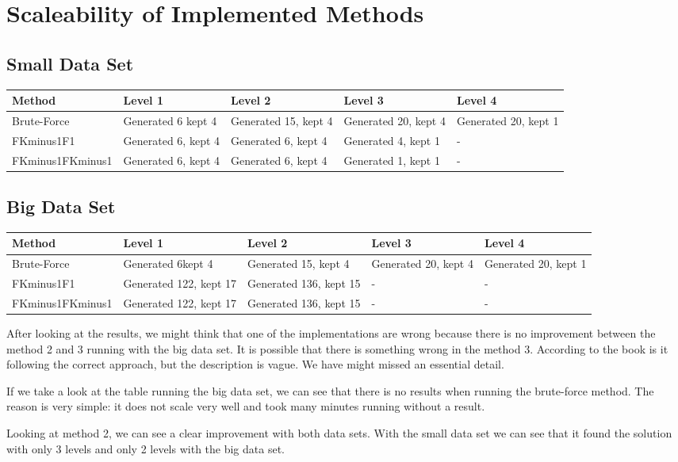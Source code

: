 \section{Scaleability of Implemented Methods}
	
	\subsection*{Small Data Set}
	\begin{table}[H]
		\begin{tabular}{| p{3.5cm} | p{2.5cm} | p{2.5cm} | p{2.5cm} | p{2.5cm} | }
			\hline
			Method & Level 1 & Level 2 & Level 3 & Level 4 \\ \hline
			Brute-Force & Generated 6 kept 4 & Generated 15, kept 4 & Generated 20, kept 4 & Generated 20, kept 1 \\ \hline
			FKminus1F1 & Generated 6, kept 4 & Generated 6, kept 4 & Generated 4, kept 1 & - \\ \hline
			FKminus1FKminus1 & Generated 6, kept 4 & Generated 6, kept 4 & Generated 1, kept 1 & - \\ \hline
		\end{tabular}
	\end{table}

	\subsection*{\bf Big Data Set}
	\begin{table}[H]
		\begin{tabular}{| p{3.5cm} | p{2.5cm} | p{2.5cm} | p{2.5cm} | p{2.5cm} | }
			\hline
			Method & Level 1 & Level 2 & Level 3 & Level 4 \\ \hline
			Brute-Force & Generated 6kept 4 & Generated 15, kept 4 & Generated 20, kept 4 & Generated 20, kept 1 \\ \hline
			FKminus1F1 & Generated 122, kept 17 & Generated 136, kept 15 & - & - \\ \hline
			FKminus1FKminus1 & Generated 122, kept 17 & Generated 136, kept 15 & - & - \\ \hline
		\end{tabular}
	\end{table}


	After looking at the results, we might think that one of the implementations are wrong because
	there is no improvement between the method 2 and 3 running with the big data set. It is possible that 
	there is something wrong in the method 3. According to the book is it following the correct
	approach, but the description is vague. We have might missed an essential detail. 


	If we take a look at the table running the big data set, we can see that there is no results
	when running the brute-force method. The reason is very simple: it does not scale very well and took
	many minutes running without a result. 


	Looking at method 2, we can see a clear improvement with both data sets. With the small data set
	we can see that it found the solution with only 3 levels and only 2 levels with the big data set. 
